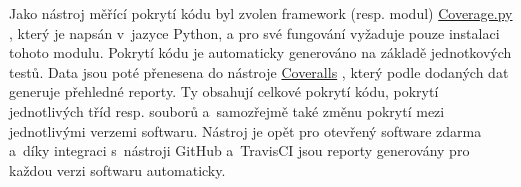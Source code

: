 		Jako nástroj měřící pokrytí kódu byl zvolen framework (resp. modul) \hyperlink{https://coverage.readthedocs.io/en/coverage-4.5.1/}{Coverage.py} \cite{coveragePy}, který je napsán v~jazyce Python, a pro své fungování vyžaduje pouze instalaci tohoto modulu. Pokrytí kódu je automaticky generováno na základě jednotkových testů. Data jsou poté přenesena do nástroje \hyperlink{https://coveralls.io/}{Coveralls} \cite{coveralls}, který podle dodaných dat generuje přehledné reporty. Ty obsahují celkové pokrytí kódu, pokrytí jednotlivých tříd resp. souborů a~samozřejmě také změnu pokrytí mezi jednotlivými verzemi softwaru. Nástroj je opět pro otevřený software zdarma a~díky integraci s~nástroji GitHub a~TravisCI jsou reporty generovány pro každou verzi softwaru automaticky.
		
		
		